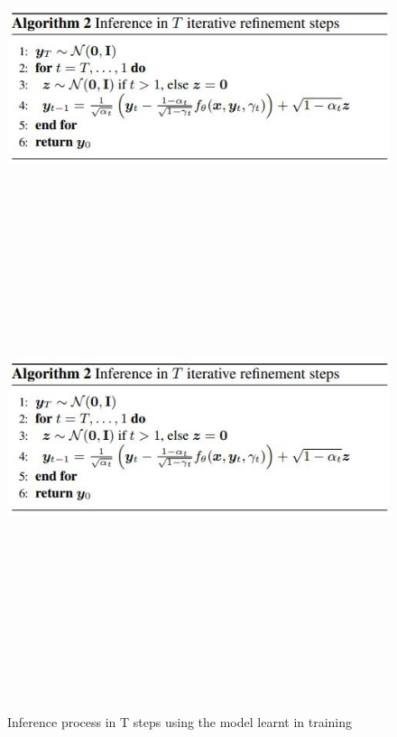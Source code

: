 \begin{figure}[!htbp]
  \begin{center}
    \leavevmode
    \ifpdf
      \includegraphics[height=2in]{Appendix1/images/WhatsApp Image 2023-05-08 at 17.34.05.jpg}
    \else
      \includegraphics[bb = 50 86 545 742, height=6in]{Appendix1/images/WhatsApp Image 2023-05-08 at 17.34.05.jpg}
    \fi
    \caption{Inference process in T steps using the model learnt in training \cite{saharia2021image}}
    \label{inference_sr3}
  \end{center}
\end{figure}

